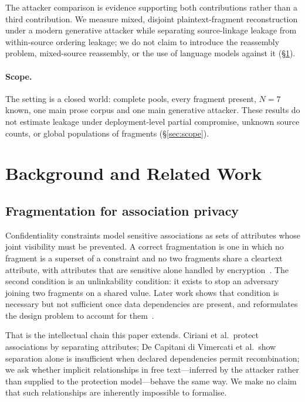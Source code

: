 \documentclass[sigconf,review]{acmart}
\begin{document}
The attacker comparison is evidence supporting both contributions rather than a
third contribution. We measure mixed, disjoint plaintext-fragment
reconstruction under a modern generative attacker while separating
source-linkage leakage from within-source ordering leakage; we do not claim to
introduce the reassembly problem, mixed-source reassembly, or the use of
language models against it (\S\ref{sec:related}).

\paragraph{Scope.} The setting is a closed world: complete pools, every
fragment present, $N=7$ known, one main prose corpus and one main generative
attacker. These results do not estimate leakage under deployment-level partial
compromise, unknown source counts, or global populations of fragments
(\S\ref{sec:scope}).

\section{Background and Related Work}
\label{sec:related}

\subsection{Fragmentation for association privacy}
Confidentiality constraints model sensitive associations as sets of attributes
whose joint visibility must be prevented. A correct fragmentation is one in
which no fragment is a superset of a constraint and no two fragments share a
cleartext attribute, with attributes that are sensitive alone handled by
encryption~\cite{ciriani2010}. The second condition is an unlinkability
condition: it exists to stop an adversary joining two fragments on a shared
value. Later work shows that condition is necessary but not sufficient once
data dependencies are present, and reformulates the design problem to account
for them~\cite{decapitani2014}.

That is the intellectual chain this paper extends. Ciriani et al.\ protect
associations by separating attributes; De Capitani di Vimercati et al.\ show
separation alone is insufficient when declared dependencies permit
recombination; we ask whether implicit relationships in free text---inferred by
the attacker rather than supplied to the protection model---behave the same
way. We make no claim that such relationships are inherently impossible to
formalise.
\end{document}
